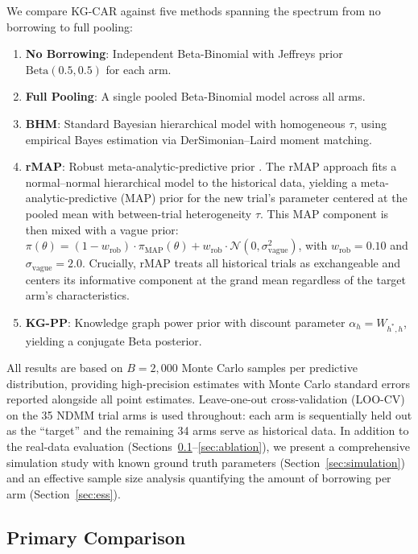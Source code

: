 \documentclass[12pt]{article}
\begin{document}
We compare KG-CAR against five methods spanning the spectrum from no borrowing to full pooling:

\begin{enumerate}
\item \textbf{No Borrowing}: Independent Beta-Binomial with Jeffreys prior $\text{Beta}(0.5, 0.5)$ for each arm.
\item \textbf{Full Pooling}: A single pooled Beta-Binomial model across all arms.
\item \textbf{BHM}: Standard Bayesian hierarchical model with homogeneous $\tau$, using empirical Bayes estimation via DerSimonian--Laird moment matching.
\item \textbf{rMAP}: Robust meta-analytic-predictive prior \citep{schmidli2014robust}. The rMAP approach fits a normal--normal hierarchical model to the historical data, yielding a meta-analytic-predictive (MAP) prior for the new trial's parameter centered at the pooled mean with between-trial heterogeneity $\tau$. This MAP component is then mixed with a vague prior: $\pi(\theta) = (1 - w_{\text{rob}}) \cdot \pi_{\text{MAP}}(\theta) + w_{\text{rob}} \cdot \mathcal{N}(0, \sigma_{\text{vague}}^2)$, with $w_{\text{rob}} = 0.10$ and $\sigma_{\text{vague}} = 2.0$. Crucially, rMAP treats all historical trials as exchangeable and centers its informative component at the grand mean regardless of the target arm's characteristics.
\item \textbf{KG-PP}: Knowledge graph power prior with discount parameter $\alpha_h = W_{h^*, h}$, yielding a conjugate Beta posterior.
\end{enumerate}

All results are based on $B = 2{,}000$ Monte Carlo samples per predictive distribution, providing high-precision estimates with Monte Carlo standard errors reported alongside all point estimates. Leave-one-out cross-validation (LOO-CV) on the 35 NDMM trial arms is used throughout: each arm is sequentially held out as the ``target'' and the remaining 34 arms serve as historical data. In addition to the real-data evaluation (Sections~\ref{sec:primary}--\ref{sec:ablation}), we present a comprehensive simulation study with known ground truth parameters (Section~\ref{sec:simulation}) and an effective sample size analysis quantifying the amount of borrowing per arm (Section~\ref{sec:ess}).

\subsection{Primary Comparison}
\label{sec:primary}
\end{document}
